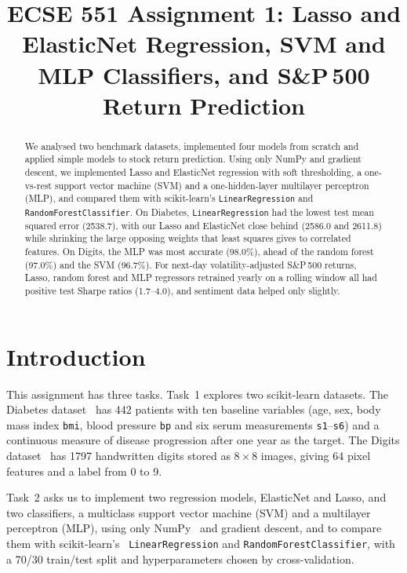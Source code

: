 \documentclass[conference]{IEEEtran}
\begin{document}
\title{ECSE 551 Assignment 1: Lasso and ElasticNet Regression, SVM and MLP Classifiers, and S\&P\,500 Return Prediction}

\author{
}

\maketitle

\begin{abstract}
We analysed two benchmark datasets, implemented four models from scratch and applied simple models to stock return prediction. Using only NumPy and gradient descent, we implemented Lasso and ElasticNet regression with soft thresholding, a one-vs-rest support vector machine (SVM) and a one-hidden-layer multilayer perceptron (MLP), and compared them with scikit-learn's \texttt{LinearRegression} and \texttt{RandomForestClassifier}. On Diabetes, \texttt{LinearRegression} had the lowest test mean squared error (2538.7), with our Lasso and ElasticNet close behind (2586.0 and 2611.8) while shrinking the large opposing weights that least squares gives to correlated features. On Digits, the MLP was most accurate (98.0\%), ahead of the random forest (97.0\%) and the SVM (96.7\%). For next-day volatility-adjusted S\&P\,500 returns, Lasso, random forest and MLP regressors retrained yearly on a rolling window all had positive test Sharpe ratios (1.7--4.0), and sentiment data helped only slightly.
\end{abstract}

\section{Introduction}
This assignment has three tasks. Task~1 explores two scikit-learn datasets. The Diabetes dataset~\cite{skAPI,efron} has 442 patients with ten baseline variables (age, sex, body mass index \texttt{bmi}, blood pressure \texttt{bp} and six serum measurements \texttt{s1}--\texttt{s6}) and a continuous measure of disease progression after one year as the target. The Digits dataset~\cite{skAPI} has 1797 handwritten digits stored as $8\times8$ images, giving 64 pixel features and a label from 0 to 9.

Task~2 asks us to implement two regression models, ElasticNet and Lasso, and two classifiers, a multiclass support vector machine (SVM) and a multilayer perceptron (MLP), using only NumPy~\cite{harris} and gradient descent, and to compare them with scikit-learn's~\cite{sklearn} \texttt{LinearRegression} and \texttt{RandomForestClassifier}, with a 70/30 train/test split and hyperparameters chosen by cross-validation.
\end{document}
